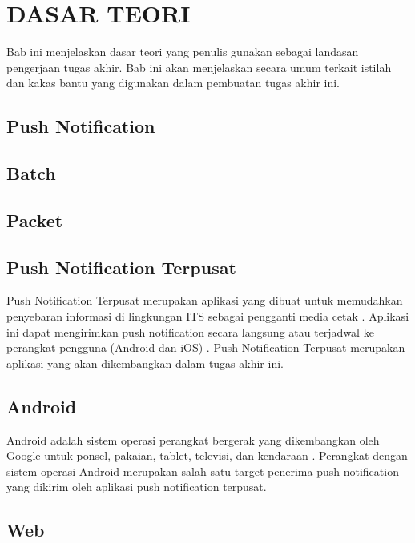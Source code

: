 \chapter{DASAR TEORI}
\par Bab ini menjelaskan dasar teori yang penulis gunakan sebagai landasan pengerjaan tugas akhir. Bab ini akan menjelaskan secara umum terkait istilah dan kakas bantu yang digunakan dalam pembuatan tugas akhir ini.

\section{Push Notification}

\section{Batch}

\section{Packet}

\section{Push Notification Terpusat}
\par Push Notification Terpusat merupakan aplikasi yang dibuat untuk memudahkan penyebaran informasi di lingkungan ITS sebagai pengganti media cetak \cite{application-thesis}. Aplikasi ini dapat mengirimkan push notification secara langsung atau terjadwal ke perangkat pengguna (Android dan iOS) \cite{application-thesis}. Push Notification Terpusat merupakan aplikasi yang akan dikembangkan dalam tugas akhir ini.

\section{Android}
\par Android adalah sistem operasi perangkat bergerak yang dikembangkan oleh Google untuk ponsel, pakaian, tablet, televisi, dan kendaraan \cite{android-online}. Perangkat dengan sistem operasi Android merupakan salah satu target penerima push notification yang dikirim oleh aplikasi push notification terpusat.

\section{Web}

